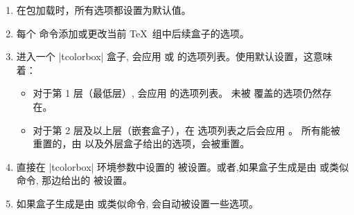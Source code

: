 \begin{enumerate}
\item %
在包加载时，所有选项都设置为默认值。
\item %
每个  命令添加或更改当前 \TeX\ 组中后续盒子的选项。
\item 

进入一个 |tcolorbox| 盒子, 会应用  或   的选项列表。使用默认设置，这意味着：
\begin{itemize}
\item %
对于第 1 层（最低层）, 会应用  的选项列表。%
未被  覆盖的选项仍然存在。
\item 
对于第 2 层及以上层（嵌套盒子），在  选项列表之后会应用 。 所有能被重置的，由  以及外层盒子给出的选项，会被重置。
\end{itemize}
\item 
直接在 |tcolorbox| 环境参数中设置的  被设置。或者,如果盒子生成是由  或类似命令, 那边给出的  被设置。
\item 
如果盒子生成是由  或类似命令, 会自动被设置一些选项。
\end{enumerate}


